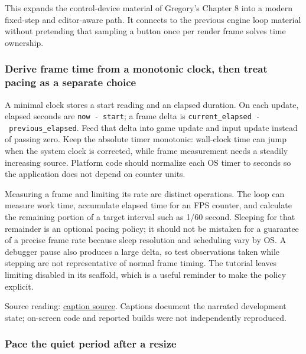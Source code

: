 This expands the control-device material of Gregory's Chapter 8 into a modern fixed-step and editor-aware path. It connects to the previous engine loop material without pretending that sampling a button once per render frame solves time ownership.

\subsubsection{Derive frame time from a monotonic clock, then treat pacing as a separate choice}\label{05-engine-i-ch014-derive-frame-time-from-a-monotonic-clock-then-treat-pacing-as-a-separate-choice}

\hypertarget{05-engine-i-ch014-derive-frame-time-from-a-monotonic-clock-then-treat-pacing-as-a-separate-choice}{}

A minimal clock stores a start reading and an elapsed duration. On each update, elapsed seconds are \texttt{now\ -\ start}; a frame delta is \texttt{current\_elapsed\ -\ previous\_elapsed}. Feed that delta into game update and input update instead of passing zero. Keep the absolute timer monotonic: wall-clock time can jump when the system clock is corrected, while frame measurement needs a steadily increasing source. Platform code should normalize each OS timer to seconds so the application does not depend on counter units.

Measuring a frame and limiting its rate are distinct operations. The loop can measure work time, accumulate elapsed time for an FPS counter, and calculate the remaining portion of a target interval such as 1/60 second. Sleeping for that remainder is an optional pacing policy; it should not be mistaken for a guarantee of a precise frame rate because sleep resolution and scheduling vary by OS. A debugger pause also produces a large delta, so test observations taken while stepping are not representative of normal frame timing. The tutorial leaves limiting disabled in its scaffold, which is a useful reminder to make the policy explicit.

Source reading: \href{https://www.youtube.com/watch?v=bbPdEkRaVNE}{caption source}. Captions document the narrated development state; on-screen code and reported builds were not independently reproduced.

\subsubsection{Pace the quiet period after a resize}\label{05-engine-i-ch014-pace-the-quiet-period-after-a-resize}

